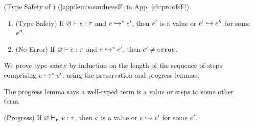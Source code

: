 \begin{theorem} (Type Safety of \sysf) 
  \label{lem:soundnessF} (\cref{app:lem:soundnessF} in App. \ref{ch:proofsF})
  \begin{enumerate}
      \item (Type Safety)
      If ${\varnothing} \vdash {\ensuremath{e}} : {\tau}$ and ${e} \hookrightarrow^{*} {e'}$,
      then $e'$ is a value or $e' \hookrightarrow e''$
      for some $e''$.
      \item (No Error)
      If ${\varnothing} \vdash {\ensuremath{e}} : {\tau}$ and ${e} \hookrightarrow^{*} {e'}$,
      then $e' \not = \texttt{error}$.
  \end{enumerate}
  \end{theorem}
We prove type safety by induction on the 
length of the sequence of steps comprising 
${e} \hookrightarrow^{*} {e'}$, using the 
preservation and progress lemmas.

 \label{sec:sysf:progressF}
%
The progress lemma says a well-typed term is a value 
or steps to some other term.
%
\begin{lemma} (Progress) \label{lem:progressFF} 
If ${\varnothing} \vdash_F {e} : {\tau}$, 
then $e$ is a value or $e \hookrightarrow e'$ for some $e'$.
\end{lemma}

